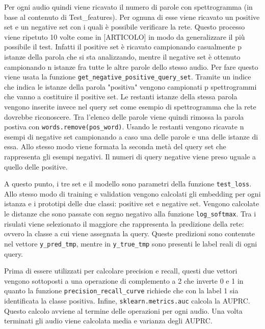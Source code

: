 \documentclass[12pt,a4paper,titlepage]{article}
\begin{document}
Per ogni audio quindi viene ricavato il numero di parole con spettrogramma (in base al contenuto di Test\_features).
Per ognuna di esse viene ricavato un positive set e un negative set con i quali è possibile verificare la rete.
Questo processo viene ripetuto 10 volte come in [ARTICOLO] in modo da generalizzare il più possibile il test.
Infatti il positive set è  ricavato campionando casualmente p istanze della parola che si sta analizzando, mentre il negative set è ottenuto campionando n istanze fra tutte le altre parole dello stesso audio.
Per fare questo viene usata la funzione \texttt{get\_negative\_positive\_query\_set}.
Tramite un indice che indica le istanze della parola "positiva" vengono campionati p spettrogrammi che vanno a costituire il positive set. Le restanti istanze della stessa parola vengono inserite invece nel query set come esempio di spettrogramma che la rete dovrebbe riconoscere.
Tra l'elenco delle parole viene quindi rimossa la parola postiva con \texttt{words.remove(pos\_word)}.
Usando le restanti vengono ricavate n esempi di negative set campionando a caso una delle parole e una delle istanze di essa.
Allo stesso modo viene formata la seconda metà del query set che rappresenta gli esempi negativi. Il numeri di query negative viene preso uguale a quello delle positive.


A questo punto, i tre set e il modello sono parametri della funzione \texttt{test\_loss}.
Allo stesso modo di training e validation vengono calcolati gli embedding per ogni istanza e i prototipi delle due classi: positive set e negative set.
Vengono calcolate le distanze che sono passate con segno negativo alla funzione \texttt{log\_softmax}.
Tra i risulati viene selezionato il maggiore che rappresenta la predizione della rete: ovvero la classe a cui viene assegnata la query.
Queste predizioni sono contenute nel vettore \texttt{y\_pred\_tmp}, mentre in \texttt{y\_true\_tmp} sono presenti le label reali di ogni query.

Prima di essere utilizzati per calcolare precision e recall, questi due vettori vengono sottoposti a una operazione di complemento a 2 che inverte 0 e 1 in quanto la funzione \texttt{precision\_recall\_curve} richiede che con la label 1 sia identificata la classe positiva.
Infine, \texttt{sklearn.metrics.auc} calcola la AUPRC.
Questo calcolo avviene al termine delle operazioni per ogni audio.
Una volta terminati gli audio viene calcolata media e varianza degli AUPRC.

\clearpage
\nocite{*}
\printbibliography
\end{document}
